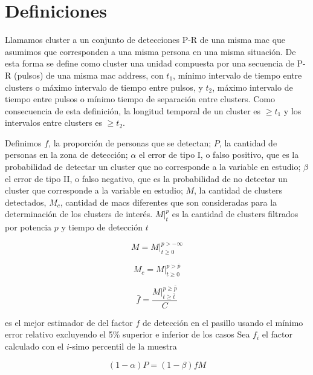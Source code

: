 \section{Definiciones}

Llamamos cluster a un conjunto de detecciones P-R de 
una misma mac que asumimos que corresponden a una misma persona en una misma situación. 
De esta forma se define como cluster una unidad compuesta por una 
secuencia de P-R (pulsos) de una misma mac address, con 
$t_1$, 
mí­nimo intervalo de tiempo entre clusters o 
máximo intervalo de tiempo entre pulsos, y 
$t_2$, 
máximo intervalo de tiempo entre pulsos o 
mí­nimo tiempo de separación entre clusters. 
Como consecuencia de esta definición, la longitud temporal de un cluster 
es $\ge t_1$ y los intervalos entre clusters es $\ge t_2$.

Definimos
$f$, la proporción de personas que se detectan;
$P$, la cantidad de personas en la zona de detección;
$\alpha$ el error de tipo I, o falso positivo, que es la probabilidad
de detectar un cluster que no corresponde a la variable en estudio;
$\beta$ el error de tipo II, o falso negativo, que es la probabilidad
de no detectar un cluster que corresponde a la variable en estudio;
$M$, la cantidad de clusters detectados,
$M_c$, cantidad de macs diferentes que son consideradas para la determinación de los clusters de interés.
$M\big|^p_t$ es la cantidad de clusters filtrados por potencia $p$ y tiempo de detección $t$

\[
M = M\big|^{p>-\infty}_{t\ge 0}
\]

\[
M_c = M\big|^{p>\bar{p}}_{t\ge 0}
\]

\begin{equation}
\bar{f} =
\frac
{
M\big|
^{p \ge \bar{p}}
_{t \ge \bar{t}}
}
{C}
\end{equation}

es el mejor estimador de del factor $f$ de detección en el pasillo
usando el mínimo error relativo excluyendo el 5\% superior e inferior de los casos
Sea $f_i$ el factor calculado con el $i$-simo percentil de la muestra

\[
(1 - \alpha) P = (1 - \beta) f M
\]

